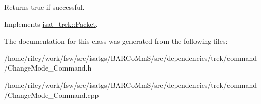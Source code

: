 \begin{DoxyReturn}{Returns}
true if successful. 
\end{DoxyReturn}


Implements \hyperlink{classisat__trek_1_1_packet}{isat\+\_\+trek\+::\+Packet}.



The documentation for this class was generated from the following files\+:\begin{DoxyCompactItemize}
\item 
/home/riley/work/fsw/src/isatgs/\+B\+A\+R\+Co\+Mm\+S/src/dependencies/trek/command/Change\+Mode\+\_\+\+Command.\+h\item 
/home/riley/work/fsw/src/isatgs/\+B\+A\+R\+Co\+Mm\+S/src/dependencies/trek/command/Change\+Mode\+\_\+\+Command.\+cpp\end{DoxyCompactItemize}
